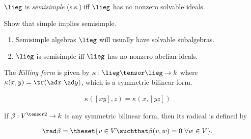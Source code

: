 \begin{definition}[Semisimple]

\(\lieg\) is \emph{semisimple} (s.s.) iff \(\lieg\) has no nonzero
solvable ideals.

\end{definition}

\begin{exercise}[?]

Show that simple implies semisimple.

\end{exercise}

\begin{remark}

\envlist

\begin{enumerate}
\def\labelenumi{\arabic{enumi}.}
\tightlist
\item
  Semisimple algebras \(\lieg\) will usually have solvable subalgebras.
\item
  \(\lieg\) is semisimple iff \(\lieg\) has no nonzero abelian ideals.
\end{enumerate}

\end{remark}

\begin{definition}

The \emph{Killing form} is given by
\(\kappa: \lieg \tensor \lieg \to k\) where
\(\kappa(x, y) = \tr(\ad x ~\ad y)\), which is a symmetric bilinear
form.

\end{definition}

\begin{lemma}[?]

\begin{align*}
\kappa([x y], z) = \kappa(x, [y z])
\end{align*}

\end{lemma}

\begin{definition}[Radical]

If \(\beta: V^{\tensor 2} \to k\) is any symmetric bilinear form, then
its radical is defined by

\begin{align*}
\rad \beta = \theset{v\in V \suchthat \beta(v, w) = 0 ~\forall w\in V}
.\end{align*}

\end{definition}

